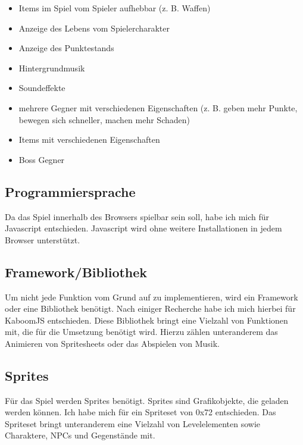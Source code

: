 \documentclass[12pt,a4paper]{article}
\begin{document}
\begin{itemize}
    \item Items im Spiel vom Spieler aufhebbar (z. B. Waffen)
    \item Anzeige des Lebens vom Spielercharakter
    \item Anzeige des Punktestands
    \item Hintergrundmusik
    \item Soundeffekte
    \item mehrere Gegner mit verschiedenen Eigenschaften (z. B. geben mehr Punkte, bewegen sich schneller, machen mehr Schaden)
    \item Items mit verschiedenen Eigenschaften
    \item Boss Gegner
\end{itemize}

\subsection{Programmiersprache}
Da das Spiel innerhalb des Browsers spielbar sein soll, habe ich mich für Javascript entschieden. Javascript wird ohne weitere Installationen in jedem Browser unterstützt.
\subsection{Framework/Bibliothek}
Um nicht jede Funktion vom Grund auf zu implementieren, wird ein Framework oder eine Bibliothek benötigt. Nach einiger Recherche habe ich mich hierbei für KaboomJS entschieden. Diese Bibliothek bringt eine Vielzahl von Funktionen mit, die für die Umsetzung benötigt wird. Hierzu zählen unteranderem das Animieren von Spritesheets oder das Abspielen von Musik.

\subsection{Sprites}
Für das Spiel werden Sprites benötigt. Sprites sind Grafikobjekte, die geladen werden können. Ich habe mich für ein Spriteset von 0x72 entschieden. Das Spriteset bringt unteranderem eine Vielzahl von Levelelementen sowie Charaktere, NPCs und Gegenstände mit.
\end{document}
